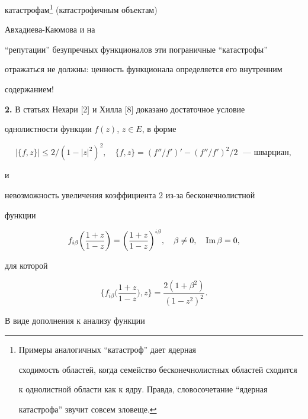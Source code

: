 катастрофам\footnote{Примеры аналогичных ``катастроф'' дает ядерная 


сходимость областей, когда семейство бесконечнолистных областей сходится 


к однолистной области как к ядру. Правда, словосочетание ``ядерная 


катастрофа'' звучит совсем зловеще.} (катастрофичным объектам) 


Авхадиева-Каюмова и на 


``репутации'' безупречных функционалов эти пограничные ``катастрофы'' 


отражаться не должны: ценность функционала определяется его внутренним 


содержанием! 


\medskip 


 


{\bf 2.} В статьях Нехари [2] и Хилла [8] доказано достаточное условие 


однолистности функции $f(z)$, $z\in E$, в форме 


\begin{equation} 


|\{f,z\}|\le 2/(1-|z|^2)^2,\quad 


\{f,z\}=(f''/f')'-(f''/f')^2/2 \;\text{ --- шварциан}, 


\end{equation} 


и 


невозможность увеличения коэффициента 2 из-за бесконечнолистной 


функции 


\begin{equation} 


f_{i\beta}\bigg(\frac{1+z}{1-z}\bigg)=\bigg( 


\frac{1+z}{1-z}\bigg)^{i\beta},\quad \beta\ne 0,\quad 


\im\beta=0, 


\end{equation} 


для которой 


$$ 


\bigg\{f_{i\beta}\bigg(\frac{1+z}{1-z}\bigg),z\bigg\}= 


\frac{2(1+\beta^2)}{(1-z^2)^2}. 


$$ 





В виде дополнения к анализу функции 


